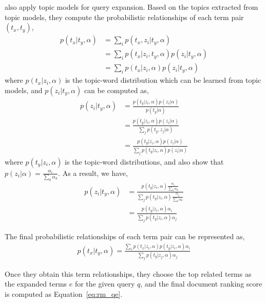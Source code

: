 \cite{Park-2009} also apply topic models for query expansion. Based on the topics extracted from topic models, they compute the probabilistic relationships of each term pair $(t_x, t_y)$, 
\begin{align}
p(t_x|t_y, \alpha) &= \sum_i p(t_x, z_i | t_y, \alpha) \\
&= \sum_i p(t_x | z_i, t_y, \alpha) p(z_i | t_y, \alpha) \\
&= \sum_i p(t_x|z_i, \alpha) p(z_i|t_y, \alpha)
\end{align}
where $p(t_x|z_i, \alpha)$ is the topic-word distribution which can be learned from topic models, and $p(z_i|t_y, \alpha)$ can be computed as,
\begin{align}
p(z_i|t_y, \alpha) &= \frac{p(t_y|z_i,\alpha)p(z_i|\alpha)}{p(t_y|\alpha)} \\
&= \frac{p(t_y|z_i,\alpha)p(z_i|\alpha)}{\sum_j p(t_y, z_j|\alpha)} \\
&= \frac{p(t_y|z_i,\alpha)p(z_i|\alpha)}{\sum_j p(t_y|z_i,\alpha)p(z_i|\alpha)}
\end{align}
where $p(t_y|z_i,\alpha)$ is the topic-word distributions, and \cite{Park-2009} also show that $p(z_i|\alpha) = \frac{\alpha_i}{\sum_k \alpha_k}$. 
As a result, we have,
\begin{align}
p(z_i|t_y, \alpha) &= \frac{p(t_y|z_i,\alpha) \frac{\alpha_i}{\sum_k \alpha_k} }{\sum_j p(t_y|z_i,\alpha) \frac{\alpha_j}{\sum_k \alpha_k}} \\
&= \frac{p(t_y|z_i,\alpha) \alpha_i}{\sum_j p(t_y|z_i,\alpha) \alpha_j}
\end{align}

The final probabilistic relationships of each term pair  can be represented as,
\begin{align}
p(t_x|t_y, \alpha) = \frac{\sum_i p(t_x|z_i, \alpha) p(t_y|z_i,\alpha) \alpha_i }{\sum_j p(t_y|z_j,\alpha) \alpha_j}
\end{align}

Once they obtain this term relationships, they choose the top related terms as the expanded terms $e$ for the given query $q$, and the final document ranking score is computed as Equation~\ref{eq:rm_qe}.


